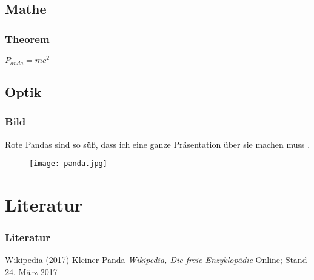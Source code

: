\documentclass{beamer}
\begin{document}
\subsection{Mathe}

\begin{frame}
	\frametitle{Theorem}
	\begin{theorem}
		$P_{anda}=mc^2$
	\end{theorem}
\end{frame}

\subsection{Optik}

\begin{frame}
	\frametitle{Bild}
	Rote Pandas sind so süß, dass ich eine ganze Präsentation über sie machen muss \cite{p1}. \pause
	\begin{figure}
		\texttt{[image: panda.jpg]}
	\end{figure}
\end{frame}

\section{Literatur}
\begin{frame}
	\frametitle{Literatur}
	\footnotesize{
		\begin{thebibliography}{99}
			 Wikipedia (2017)
			\newblock Kleiner Panda
			\newblock \emph{Wikipedia{,} Die freie Enzyklopädie}
			\newblock Online; Stand 24. März 2017
		\end{thebibliography}
	}
\end{frame}
\end{document}
